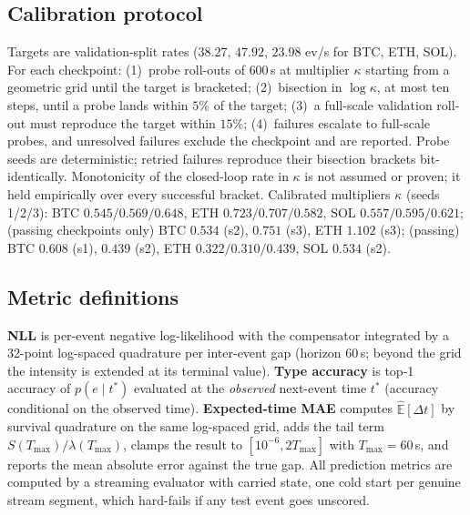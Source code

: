 \subsection{Calibration protocol}
Targets are validation-split rates ($38.27$, $47.92$, $23.98$ ev/s for BTC,
ETH, SOL). For each checkpoint: (1)~probe roll-outs of $600$\,s at
multiplier $\kappa$ starting from a geometric grid until the target is
bracketed; (2)~bisection in $\log\kappa$, at most ten steps, until a probe
lands within $5\%$ of the target; (3)~a full-scale validation roll-out must
reproduce the target within $15\%$; (4)~failures escalate to full-scale
probes, and unresolved failures exclude the checkpoint and are reported.
Probe seeds are deterministic; retried failures reproduce their bisection
brackets bit-identically. Monotonicity of the closed-loop rate in $\kappa$
is not assumed or proven; it held empirically over every successful bracket.
Calibrated multipliers $\kappa$ (seeds 1/2/3): \ssppp{} BTC
$0.545/0.569/0.648$, ETH $0.723/0.707/0.582$, SOL $0.557/0.595/0.621$;
\spppu{} (passing checkpoints only) BTC $0.534$ (s2), $0.751$ (s3), ETH
$1.102$ (s3); \spppub{} (passing) BTC $0.608$ (s1), $0.439$ (s2), ETH
$0.322/0.310/0.439$, SOL $0.534$ (s2).

\subsection{Metric definitions}
\textbf{NLL} is per-event negative log-likelihood with the compensator
integrated by a 32-point log-spaced quadrature per inter-event gap
(horizon $60$\,s; beyond the grid the intensity is extended at its terminal
value). \textbf{Type accuracy} is top-1 accuracy of $p(e\mid t^{*})$
evaluated at the \emph{observed} next-event time $t^{*}$ (accuracy
conditional on the observed time). \textbf{Expected-time MAE} computes
$\hat{\mathbb{E}}[\Delta t]$ by survival quadrature on the same log-spaced
grid, adds the tail term $S(T_{\max})/\lambda(T_{\max})$, clamps the result
to $[10^{-6},2T_{\max}]$ with $T_{\max}=60$\,s, and reports the mean
absolute error against the true gap. All prediction metrics are computed by
a streaming evaluator with carried state, one cold start per genuine stream
segment, which hard-fails if any test event goes unscored.

